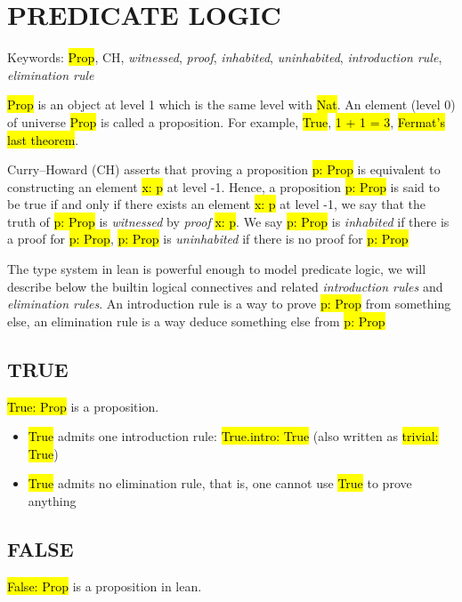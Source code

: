 \chapter{PREDICATE LOGIC}

Keywords: \hl{Prop}, CH, \textit{witnessed}, \textit{proof}, \textit{inhabited}, \textit{uninhabited}, \textit{introduction rule}, \textit{elimination rule}

\hl{Prop} is an object at level 1 which is the same level with \hl{Nat}. An element (level 0) of universe \hl{Prop} is called a proposition. For example, \hl{True}, \hl{1 + 1 = 3}, \hl{Fermat's last theorem}.

Curry–Howard (CH) \cite{CH} asserts that proving a proposition \hl{p: Prop} is equivalent to constructing an element \hl{x: p} at level -1. Hence, a proposition \hl{p: Prop} is said to be true if and only if there exists an element  \hl{x: p} at level -1, we say that the truth of \hl{p: Prop} is \textit{witnessed} by \textit{proof} \hl{x: p}. We say \hl{p: Prop} is \textit{inhabited} if there is a proof for \hl{p: Prop}, \hl{p: Prop} is \textit{uninhabited} if there is no proof for \hl{p: Prop}

The type system in lean is powerful enough to model predicate logic, we will describe below the builtin logical connectives and related \textit{introduction rules} and \textit{elimination rules}. An introduction rule is a way to prove \hl{p: Prop} from something else, an elimination rule is a way deduce something else from \hl{p: Prop}

\section{TRUE}

\hl{True: Prop} is a proposition.

\begin{itemize}
	\item \hl{True} admits one introduction rule: \hl{True.intro: True} (also written as \hl{trivial: True})
	
	\item \hl{True} admits no elimination rule, that is, one cannot use \hl{True} to prove anything
\end{itemize}


\section{FALSE}

\hl{False: Prop} is a proposition in lean.


